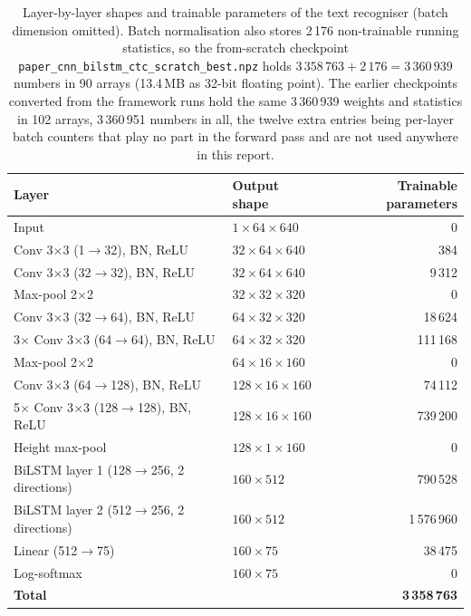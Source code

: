 \begin{table}[h]
\centering
\fontsize{9.5}{11.5}\selectfont
\begin{tabular}{|l|l|r|}
\hline
\textbf{Layer} & \textbf{Output shape} & \textbf{Trainable parameters} \\
\hline
Input & $1\times64\times640$ & 0 \\
Conv 3$\times$3 (1$\to$32), BN, ReLU & $32\times64\times640$ & 384 \\
Conv 3$\times$3 (32$\to$32), BN, ReLU & $32\times64\times640$ & 9\,312 \\
Max-pool 2$\times$2 & $32\times32\times320$ & 0 \\
Conv 3$\times$3 (32$\to$64), BN, ReLU & $64\times32\times320$ & 18\,624 \\
3$\times$ Conv 3$\times$3 (64$\to$64), BN, ReLU & $64\times32\times320$ & 111\,168 \\
Max-pool 2$\times$2 & $64\times16\times160$ & 0 \\
Conv 3$\times$3 (64$\to$128), BN, ReLU & $128\times16\times160$ & 74\,112 \\
5$\times$ Conv 3$\times$3 (128$\to$128), BN, ReLU & $128\times16\times160$ & 739\,200 \\
Height max-pool & $128\times1\times160$ & 0 \\
BiLSTM layer 1 (128$\to$256, 2 directions) & $160\times512$ & 790\,528 \\
BiLSTM layer 2 (512$\to$256, 2 directions) & $160\times512$ & 1\,576\,960 \\
Linear (512$\to$75) & $160\times75$ & 38\,475 \\
Log-softmax & $160\times75$ & 0 \\
\hline
\textbf{Total} & & \textbf{3\,358\,763} \\
\hline
\end{tabular}
\caption{Layer-by-layer shapes and trainable parameters of the text recogniser (batch dimension omitted). Batch normalisation also stores 2\,176 non-trainable running statistics, so the from-scratch checkpoint \texttt{paper\_cnn\_bilstm\_ctc\_scratch\_best.npz} holds $3\,358\,763+2\,176=3\,360\,939$ numbers in 90 arrays (13.4\,MB as 32-bit floating point). The earlier checkpoints converted from the framework runs hold the same 3\,360\,939 weights and statistics in 102 arrays, 3\,360\,951 numbers in all, the twelve extra entries being per-layer batch counters that play no part in the forward pass and are not used anywhere in this report.}
\label{tab:rec-layers}
\end{table}

